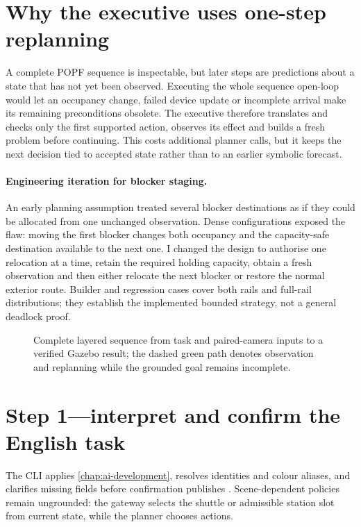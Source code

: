 \section{Why the executive uses one-step replanning}

A complete POPF sequence is inspectable, but later steps are predictions about a
state that has not yet been observed. Executing the whole sequence open-loop
would let an occupancy change, failed device update or incomplete arrival make
its remaining preconditions obsolete. The executive therefore translates and
checks only the first supported action, observes its effect and builds a fresh
problem before continuing. This costs additional planner calls, but it keeps the
next decision tied to accepted state rather than to an earlier symbolic forecast.

\paragraph{Engineering iteration for blocker staging.}
An early planning assumption treated several blocker destinations as if they
could be allocated from one unchanged observation. Dense configurations exposed
the flaw: moving the first blocker changes both occupancy and the capacity-safe
destination available to the next one. I changed the design to authorise one
relocation at a time, retain the required holding capacity, obtain a fresh
observation and then either relocate the next blocker or restore the normal
exterior route. Builder and regression cases cover both rails and full-rail
distributions; they establish the implemented bounded strategy, not a general
deadlock proof.

\begin{figure}[p]
  \centering
  
  \caption[Room~315 English-to-motion runtime architecture.]
  {Complete layered sequence from task and paired-camera inputs to a verified
  Gazebo
  result; the dashed green path denotes observation and replanning while the
  grounded goal remains incomplete.}
  \label{fig:neurosymbolic-architecture}
\end{figure}

\section{Step 1---interpret and confirm the English task}

The CLI applies \cref{chap:ai-development}, resolves identities and colour
aliases, and clarifies missing fields before confirmation publishes
. Scene-dependent policies remain ungrounded: the gateway selects
the shuttle or admissible station slot from current state, while the planner
chooses actions.

